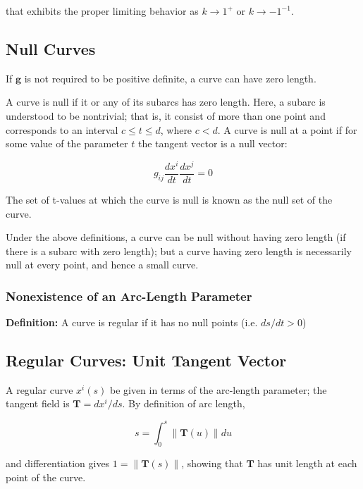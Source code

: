 \documentclass{article}
\newcommand\norm[1]{\left\lVert#1\right\rVert}
\begin{document}
that exhibits the proper limiting behavior as $k \rightarrow 1^+$ or $k \rightarrow -1^{-1}$.


\subsection{Null Curves}

If $\mathbf{ g }$ is not required to be positive definite, a curve can have zero length.

A curve is null if it or any of its subarcs has zero length.  Here, a subarc is understood to be nontrivial; that is, it consist of more than one point and corresponds to an interval $c \leq t \leq d$, where $c < d$.
A curve is null at a point if for some value of the parameter $t$ the tangent vector is a null vector:

\begin{equation*}
	g_{ij} \frac{ dx^i }{ dt } \frac{ dx^j }{ dt } = 0
\end{equation*}

\noindent
The set of t-values at which the curve is null is known as the null set of the curve.

Under the above definitions, a curve can be null without having zero length (if there is a subarc with zero length); but a curve having zero length is necessarily null at every point, and hence a small curve.

\subsubsection{Nonexistence of an Arc-Length Parameter}

\noindent \textbf{Definition: }
A curve is regular if it has no null points (i.e. $ds/dt > 0$)

\subsection{Regular Curves: Unit Tangent Vector}

A regular curve $x^i(s)$ be given in terms of the arc-length parameter; the tangent field is $\mathbf{ T } = dx^i / ds$.  By definition of arc length,


\begin{equation*}
	s = \int_0^s \norm{ \mathbf{ T }(u) } du
\end{equation*}

and differentiation gives $1 = \norm{ \mathbf{ T }(s) }$, showing that $\mathbf{ T }$ has unit length at each point of the curve.
\end{document}
